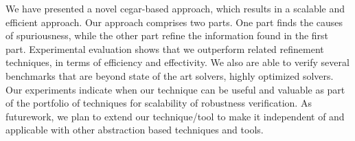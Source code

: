We have presented a novel cegar-based approach, which results in a scalable and efficient approach.  
Our approach comprises two parts. One part finds the causes of spuriousness, 
while the other part refine  the information found in the first part. 
Experimental evaluation shows that we outperform related refinement techniques, in terms of efficiency and effectivity. 
We also are able to verify several benchmarks that are beyond state of the art solvers, highly optimized solvers. Our experiments indicate when our technique can be useful and valuable as part of the portfolio of techniques for scalability of robustness verification. As futurework, we plan to extend our technique/tool to make it independent of \deeppoly{} and applicable with other 
abstraction based techniques and tools. %



